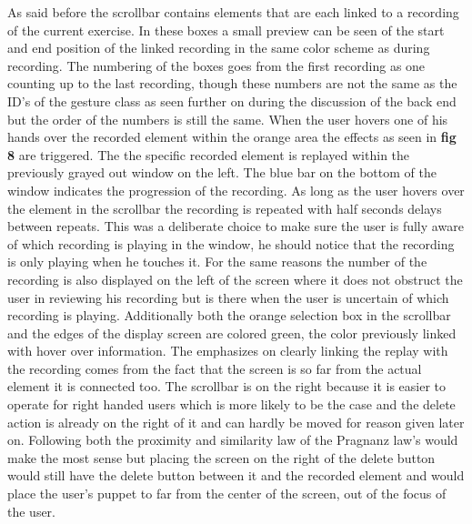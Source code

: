As said before the scrollbar contains elements that are each linked to a recording of the current exercise. In these boxes a small preview can be seen of the start and end position of the linked recording in the same color scheme as during recording. The numbering of the boxes goes from the first recording as one counting up to the last recording, though these numbers are not the same as the ID's of the gesture class as seen further on during the discussion of the back end but the order of the numbers is still the same. When the user hovers one of his hands over the recorded element within the orange area the effects as seen in \textbf{ fig 8} are triggered. The the specific recorded element is replayed within the previously grayed out window on the left. The blue bar on the bottom of the window indicates the progression of the recording. As long as the user hovers over the element in the scrollbar the recording is repeated with half seconds delays between repeats. This was a deliberate choice to make sure the user is fully aware of which recording is playing in the window, he should notice that the recording is only playing when he touches it. For the same reasons the number of the recording is also displayed on the left of the screen where it does not obstruct the user in reviewing his recording but is there when the user is uncertain of which recording is playing. Additionally both the orange selection box in the scrollbar and the edges of the display screen are colored green, the color previously linked with hover over information. The emphasizes on clearly linking the replay with the recording comes from the fact that the screen is so far from the actual element it is connected too. The scrollbar is on the right because it is easier to operate for right handed users which is more likely to be the case and the delete action is already on the right of it and can hardly be moved for reason given later on. Following both the proximity and similarity law of the Pragnanz law's would make the most sense but placing the screen on the right of the delete button would still have the delete button between it and the recorded element and would place the user's puppet to far from the center of the screen, out of the focus of the user.\\

